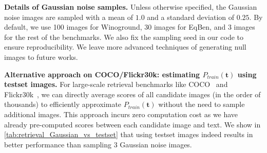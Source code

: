 \documentclass{article} \usepackage{iclr2024_conference,times}
\begin{document}
{\bf Details of Gaussian noise samples. } Unless otherwise specified, the Gaussian noise images are sampled with a mean of $1.0$ and a standard deviation of $0.25$. By default, we use 100 images for Winoground, 30 images for EqBen, and 3 images for the rest of the benchmarks. We also fix the sampling seed in our code to ensure reproducibility. We leave more advanced techniques of generating null images to future works.

{\bf Alternative approach on COCO/Flickr30k: estimating $P_{train}(\mathbf{t})$ using testset images. } For large-scale retrieval benchmarks like COCO~\citep{coco} and Flickr30k~\citep{flickr30k}, we can directly average scores of all candidate images (in the order of thousands) to efficiently approximate $P_{train}(\mathbf{t})$ without the need to sample additional images. This approach incurs zero computation cost as we have already pre-computed scores between each candidate image and text. We show in \autoref{tab:retrieval_Gaussian_vs_testset} that using testset images indeed results in better performance than sampling 3 Gaussian noise images.



\begin{table}[h]
  \centering
    \caption{\small {\bf I-to-T retrieval on COCO/Flickr30k using different sampling methods.} Estimating $P_{train}(\mathbf{t})$ by averaging the scores of testset images (with zero computational cost) demonstrates superior performance compared to sampling additional Gaussian noise images.}
    \label{tab:retrieval_Gaussian_vs_testset}
\end{table}
\end{document}
